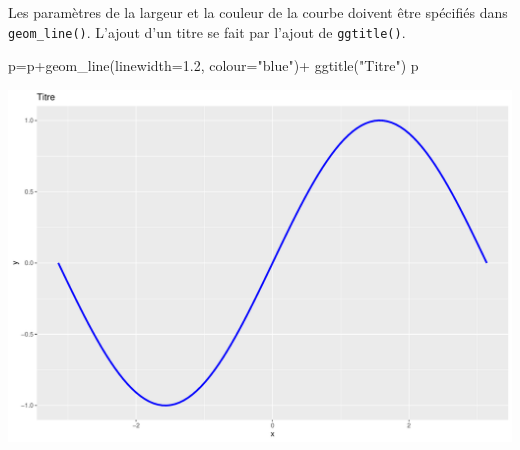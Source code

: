\documentclass[
  8pt,
  ignorenonframetext,
]{beamer}
\newenvironment{Shaded}{\begin{snugshade}}{\end{snugshade}}
\newcommand{\AttributeTok}[1]{\textcolor[rgb]{0.77,0.63,0.00}{#1}}
\newcommand{\FloatTok}[1]{\textcolor[rgb]{0.00,0.00,0.81}{#1}}
\newcommand{\FunctionTok}[1]{\textcolor[rgb]{0.00,0.00,0.00}{#1}}
\newcommand{\NormalTok}[1]{#1}
\newcommand{\OtherTok}[1]{\textcolor[rgb]{0.56,0.35,0.01}{#1}}
\newcommand{\SpecialCharTok}[1]{\textcolor[rgb]{0.00,0.00,0.00}{#1}}
\newcommand{\StringTok}[1]{\textcolor[rgb]{0.31,0.60,0.02}{#1}}
\begin{document}
\begin{frame}[fragile]
Les paramètres de la largeur et la couleur de la courbe doivent être
spécifiés dans \texttt{geom\_line()}. L'ajout d'un titre se fait par
l'ajout de \texttt{ggtitle()}.

\begin{Shaded}
\begin{Highlighting}[]
\NormalTok{p}\OtherTok{=}\NormalTok{p}\SpecialCharTok{+}\FunctionTok{geom\_line}\NormalTok{(}\AttributeTok{linewidth=}\FloatTok{1.2}\NormalTok{, }\AttributeTok{colour=}\StringTok{"blue"}\NormalTok{)}\SpecialCharTok{+} \FunctionTok{ggtitle}\NormalTok{(}\StringTok{"Titre"}\NormalTok{)}
\NormalTok{p}
\end{Highlighting}
\end{Shaded}

\begin{center}\includegraphics[height=0.7\textheight]{Chap2_R_files/figure-beamer/unnamed-chunk-11-1} \end{center}
\end{frame}
\end{document}
